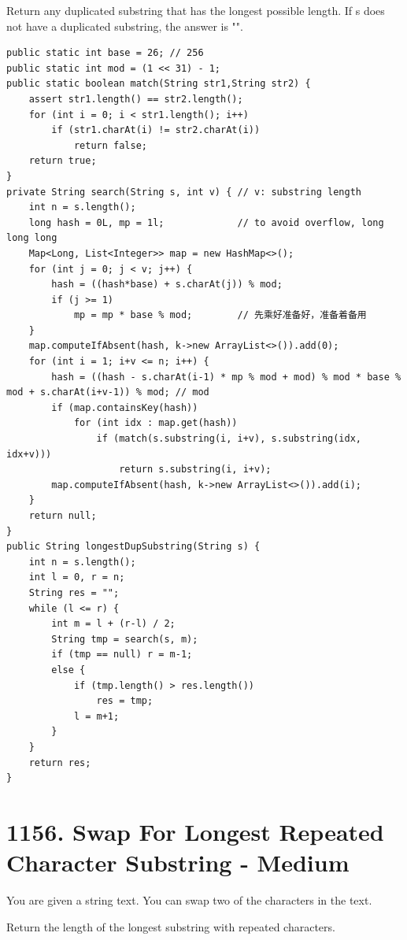\documentclass[9pt, b5paaper]{book}
\begin{document}
Return any duplicated substring that has the longest possible length. If s does not have a duplicated substring, the answer is "".
\begin{verbatim}
public static int base = 26; // 256
public static int mod = (1 << 31) - 1;
public static boolean match(String str1,String str2) {
    assert str1.length() == str2.length();
    for (int i = 0; i < str1.length(); i++) 
        if (str1.charAt(i) != str2.charAt(i))
            return false; 
    return true; 
}
private String search(String s, int v) { // v: substring length
    int n = s.length();
    long hash = 0L, mp = 1l;             // to avoid overflow, long long long
    Map<Long, List<Integer>> map = new HashMap<>();
    for (int j = 0; j < v; j++) {
        hash = ((hash*base) + s.charAt(j)) % mod;
        if (j >= 1)
            mp = mp * base % mod;        // 先乘好准备好，准备着备用 
    }
    map.computeIfAbsent(hash, k->new ArrayList<>()).add(0);
    for (int i = 1; i+v <= n; i++) {
        hash = ((hash - s.charAt(i-1) * mp % mod + mod) % mod * base % mod + s.charAt(i+v-1)) % mod; // mod 
        if (map.containsKey(hash)) 
            for (int idx : map.get(hash)) 
                if (match(s.substring(i, i+v), s.substring(idx, idx+v)))
                    return s.substring(i, i+v);
        map.computeIfAbsent(hash, k->new ArrayList<>()).add(i);
    }
    return null;
}
public String longestDupSubstring(String s) {
    int n = s.length();
    int l = 0, r = n;
    String res = "";
    while (l <= r) {
        int m = l + (r-l) / 2;
        String tmp = search(s, m);
        if (tmp == null) r = m-1;
        else {
            if (tmp.length() > res.length())
                res = tmp;
            l = m+1;
        }
    }
    return res;
}
\end{verbatim}

\section{1156. Swap For Longest Repeated Character Substring - Medium}
\label{sec-6-7}
You are given a string text. You can swap two of the characters in the text.

Return the length of the longest substring with repeated characters.
\end{document}
